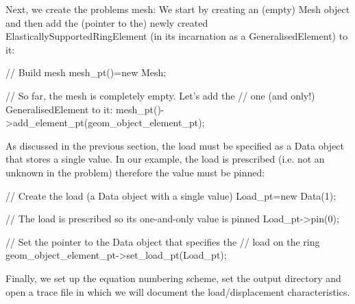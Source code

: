Next, we create the problem\textquotesingle{}s mesh\+: We start by creating an (empty) {\ttfamily Mesh} object and then add the (pointer to the) newly created {\ttfamily Elastically\+Supported\+Ring\+Element} (in its incarnation as a {\ttfamily Generalised\+Element}) to it\+:


\begin{DoxyCodeInclude}
 \textcolor{comment}{// Build mesh}
 mesh\_pt()=\textcolor{keyword}{new} Mesh;

 \textcolor{comment}{// So far, the mesh is completely empty. Let's add the }
 \textcolor{comment}{// one (and only!) GeneralisedElement to it:}
 mesh\_pt()->add\_element\_pt(geom\_object\_element\_pt);

\end{DoxyCodeInclude}


As discussed in the previous section, the load must be specified as a {\ttfamily Data} object that stores a single value. In our example, the load is prescribed (i.\+e. not an unknown in the problem) therefore the value must be pinned\+:


\begin{DoxyCodeInclude}
 \textcolor{comment}{// Create the load (a Data object with a single value)}
 Load\_pt=\textcolor{keyword}{new} Data(1);
   
 \textcolor{comment}{// The load is prescribed so its one-and-only value is pinned}
 Load\_pt->pin(0);

 \textcolor{comment}{// Set the pointer to the Data object that specifies the }
 \textcolor{comment}{// load on the ring}
 geom\_object\_element\_pt->set\_load\_pt(Load\_pt);

\end{DoxyCodeInclude}


Finally, we set up the equation numbering scheme, set the output directory and open a trace file in which we will document the load/displacement characteristics.






